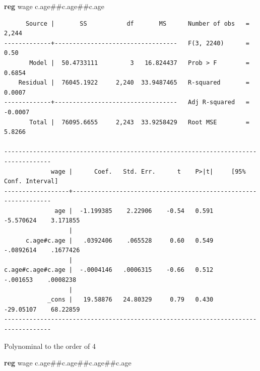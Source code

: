 \documentclass[
]{book}
\newenvironment{Shaded}{\begin{snugshade}}{\end{snugshade}}
\newcommand{\KeywordTok}[1]{\textcolor[rgb]{0.13,0.29,0.53}{\textbf{#1}}}
\newcommand{\NormalTok}[1]{#1}
\begin{document}
\begin{Shaded}
\begin{Highlighting}[]
\KeywordTok{reg}\NormalTok{ wage c.age\#\#c.age\#\#c.age}
\end{Highlighting}
\end{Shaded}

\begin{verbatim}
      Source |       SS           df       MS      Number of obs   =     2,244
-------------+----------------------------------   F(3, 2240)      =      0.50
       Model |  50.4733111         3   16.824437   Prob > F        =    0.6854
    Residual |  76045.1922     2,240  33.9487465   R-squared       =    0.0007
-------------+----------------------------------   Adj R-squared   =   -0.0007
       Total |  76095.6655     2,243  33.9258429   Root MSE        =    5.8266

-----------------------------------------------------------------------------------
             wage |      Coef.   Std. Err.      t    P>|t|     [95% Conf. Interval]
------------------+----------------------------------------------------------------
              age |  -1.199385    2.22906    -0.54   0.591    -5.570624    3.171855
                  |
      c.age#c.age |   .0392406    .065528     0.60   0.549    -.0892614    .1677426
                  |
c.age#c.age#c.age |  -.0004146   .0006315    -0.66   0.512     -.001653    .0008238
                  |
            _cons |   19.58876   24.80329     0.79   0.430    -29.05107    68.22859
-----------------------------------------------------------------------------------
\end{verbatim}

Polynominal to the order of 4

\begin{Shaded}
\begin{Highlighting}[]
\KeywordTok{reg}\NormalTok{ wage c.age\#\#c.age\#\#c.age\#\#c.age}
\end{Highlighting}
\end{Shaded}
\end{document}
